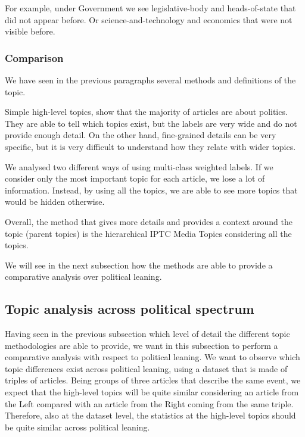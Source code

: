 For example, under Government we see legislative-body and heads-of-state that did not appear before. Or science-and-technology and economics that were not visible before.




\subsubsection{\statusgreen Comparison}

We have seen in the previous paragraphs several methods and definitions of the topic.

Simple high-level topics, show that the majority of articles are about politics. They are able to tell which topics exist, but the labels are very wide and do not provide enough detail.
On the other hand, fine-grained details can be very specific, but it is very difficult to understand how they relate with wider topics.

We analysed two different ways of using multi-class weighted labels. If we consider only the most important topic for each article, we lose a lot of information. Instead, by using all the topics, we are able to see more topics that would be hidden otherwise.

Overall, the method that gives more details and provides a context around the topic (parent topics) is the hierarchical IPTC Media Topics considering all the topics.

We will see in the next subsection how the methods are able to provide a comparative analysis over political leaning.



\subsection{\statusgreen Topic analysis across political spectrum}
\label{ssec:topics_topics_leaning}

Having seen in the previous subsection which level of detail the different topic methodologies are able to provide, we want in this subsection to perform a comparative analysis with respect to political leaning.
We want to observe which topic differences exist across political leaning, using a dataset that is made of triples of articles.
Being groups of three articles that describe the same event, we expect that the high-level topics will be quite similar considering an article from the Left compared with an article from the Right coming from the same triple.
Therefore, also at the dataset level, the statistics at the high-level topics should be quite similar across political leaning.

